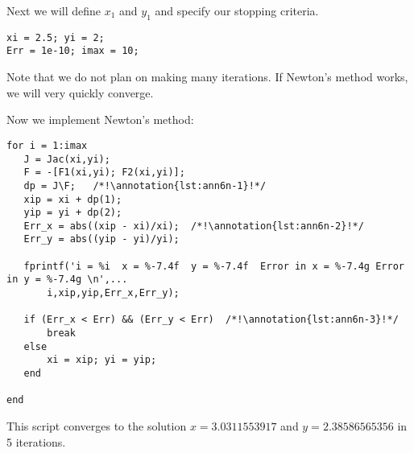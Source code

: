 \vspace{0.15cm}

\noindent Next we will define $x_1$ and $y_1$ and specify our stopping criteria.
\begin{lstlisting}[style=myMatlab,name=lec6n-ex1]
xi = 2.5; yi = 2; 
Err = 1e-10; imax = 10;
\end{lstlisting}
Note that we do not plan on making many iterations.  If Newton's method works, we will very quickly converge.
\vspace{4.0cm}

\noindent Now we implement Newton's method:
\begin{lstlisting}[style=myMatlab,name=lec6n-ex1]
for i = 1:imax
   J = Jac(xi,yi);
   F = -[F1(xi,yi); F2(xi,yi)];
   dp = J\F;   /*!\annotation{lst:ann6n-1}!*/
   xip = xi + dp(1);
   yip = yi + dp(2);
   Err_x = abs((xip - xi)/xi);  /*!\annotation{lst:ann6n-2}!*/
   Err_y = abs((yip - yi)/yi);
   
   fprintf('i = %i  x = %-7.4f  y = %-7.4f  Error in x = %-7.4g Error in y = %-7.4g \n',...
       i,xip,yip,Err_x,Err_y);
   
   if (Err_x < Err) && (Err_y < Err)  /*!\annotation{lst:ann6n-3}!*/
       break
   else
       xi = xip; yi = yip;
   end
    
end
\end{lstlisting}
This script converges to the solution $x = 3.0311553917$ and $y=2.38586565356$ in 5 iterations.

